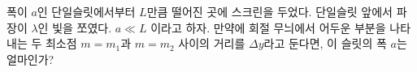 \documentclass[tightenlines,floatfix,nofootinbib,superscriptaddress,fleqn]{revtex4}
\begin{document}
\vspace{1cm}

폭이 $a$인 단일슬릿에서부터 $L$만큼 떨어진 곳에 스크린을
두었다. 단일슬릿 앞에서 파장이 $\lambda$인 빛을 쪼였다. $a\ll L$
이라고 하자. 만약에 회절 무늬에서 어두운 부분을 나타내는 두 최소점
$m=m_1$과 $m=m_2$ 사이의 거리를 $\Delta y$라고 둔다면, 이 슬릿의 폭
$a$는 얼마인가? 
\end{document}

